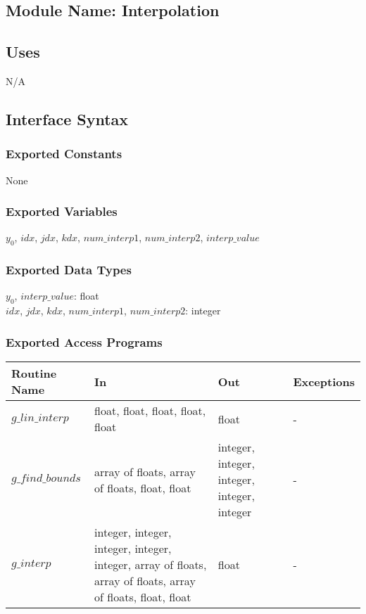 \documentclass[12pt]{article}
\begin{document}
\subsection{Module Name: Interpolation}

\subsection{Uses}

N/A

\subsection{Interface Syntax}

\subsubsection{Exported Constants}

None

\subsubsection{Exported Variables}

$y_{0}$, $idx$, $jdx$, $kdx$, $num\_interp1$, $num\_interp2$, $interp\_value$

\subsubsection{Exported Data Types}

$y_{0}$, $interp\_value$: float \\
$idx$, $jdx$, $kdx$, $num\_interp1$, $num\_interp2$: integer 

\subsubsection{Exported Access Programs}

\begin{center}
\begin{tabular}{l p{2.8cm} p{3cm} l}\hline 
\textbf{Routine Name} & \textbf{In} &\textbf{Out} & \textbf{Exceptions} \\ \hline 
$g\_lin\_interp$ & float, float, float, float, float & float & - \\ \hline
$g\_find\_bounds$ & array of floats, array of floats, float, float & integer, integer, integer, integer, integer & - \\ \hline
$g\_interp$ & integer, integer, integer, integer, integer, array of floats, array of floats, array of floats, float, float & float & - \\ \hline
\end{tabular}
\end{center}
\end{document}

